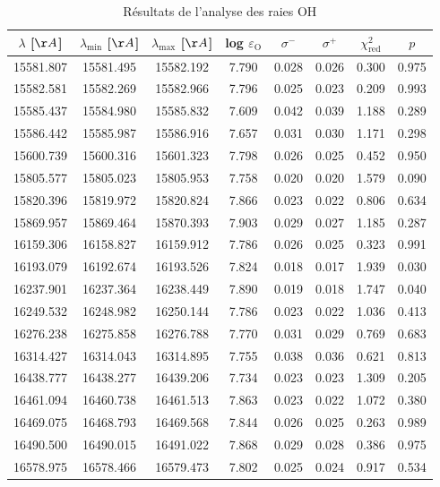 \begin{table}
\centering
\caption{Résultats de l'analyse des raies OH}
\label{tab:resultats_OH}
\begin{tabular}{cccccccc}
\toprule
\midrule
$\lambda$ [$\AA$] & $\lambda_{\mathrm{min}}$ [$\AA$] & $\lambda_{\mathrm{max}}$ [$\AA$] & log $\varepsilon_{\mathrm{O}}$ & $\sigma^{-}$ & $\sigma^{+}$ & $\chi^2_{\mathrm{red}}$ & $p$ \\
\midrule
15581.807 & 15581.495 & 15582.192 & 7.790 & 0.028 & 0.026 & 0.300 & 0.975 \\
15582.581 & 15582.269 & 15582.966 & 7.796 & 0.025 & 0.023 & 0.209 & 0.993 \\
15585.437 & 15584.980 & 15585.832 & 7.609 & 0.042 & 0.039 & 1.188 & 0.289 \\
15586.442 & 15585.987 & 15586.916 & 7.657 & 0.031 & 0.030 & 1.171 & 0.298 \\
15600.739 & 15600.316 & 15601.323 & 7.798 & 0.026 & 0.025 & 0.452 & 0.950 \\
15805.577 & 15805.023 & 15805.953 & 7.758 & 0.020 & 0.020 & 1.579 & 0.090 \\
15820.396 & 15819.972 & 15820.824 & 7.866 & 0.023 & 0.022 & 0.806 & 0.634 \\
15869.957 & 15869.464 & 15870.393 & 7.903 & 0.029 & 0.027 & 1.185 & 0.287 \\
16159.306 & 16158.827 & 16159.912 & 7.786 & 0.026 & 0.025 & 0.323 & 0.991 \\
16193.079 & 16192.674 & 16193.526 & 7.824 & 0.018 & 0.017 & 1.939 & 0.030 \\
16237.901 & 16237.364 & 16238.449 & 7.890 & 0.019 & 0.018 & 1.747 & 0.040 \\
16249.532 & 16248.982 & 16250.144 & 7.786 & 0.023 & 0.022 & 1.036 & 0.413 \\
16276.238 & 16275.858 & 16276.788 & 7.770 & 0.031 & 0.029 & 0.769 & 0.683 \\
16314.427 & 16314.043 & 16314.895 & 7.755 & 0.038 & 0.036 & 0.621 & 0.813 \\
16438.777 & 16438.277 & 16439.206 & 7.734 & 0.023 & 0.023 & 1.309 & 0.205 \\
16461.094 & 16460.738 & 16461.513 & 7.863 & 0.023 & 0.022 & 1.072 & 0.380 \\
16469.075 & 16468.793 & 16469.568 & 7.844 & 0.026 & 0.025 & 0.263 & 0.989 \\
16490.500 & 16490.015 & 16491.022 & 7.868 & 0.029 & 0.028 & 0.386 & 0.975 \\
16578.975 & 16578.466 & 16579.473 & 7.802 & 0.025 & 0.024 & 0.917 & 0.534 \\

\end{tabular}
\end{table}
